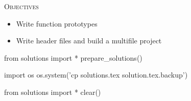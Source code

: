 
\textsc{Objectives}
\begin{itemize}
\item Write function prototypes
\item Write header files and build a multifile project
\end{itemize}






\begin{python0}
from solutions import *
prepare_solutions()
\end{python0}
\begin{python}
import os
os.system('cp solutions.tex solution.tex.backup')  
\end{python}

\begin{python0}
from solutions import *
clear()
\end{python0}
